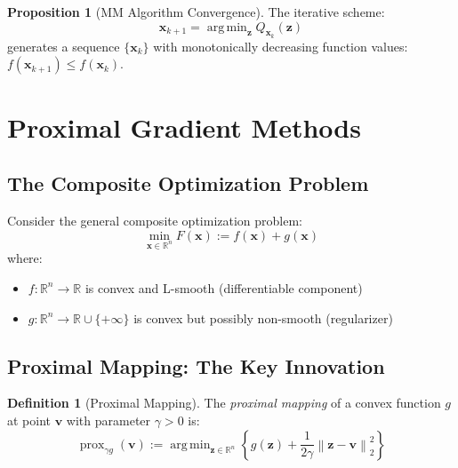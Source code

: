 \documentclass[12pt]{article}
\renewcommand{\vec}[1]{\mathbf{#1}}
\DeclareMathOperator{\prox}{prox}
\DeclareMathOperator{\argmin}{arg\,min}
\newcommand{\norm}[1]{\left\lVert#1\right\rVert}
\newcommand{\R}{\mathbb{R}}
\theoremstyle{definition}
\newtheorem{definition}{Definition}[section]
\newtheorem{proposition}[theorem]{Proposition}
\begin{document}
\begin{proposition}[MM Algorithm Convergence]
    The iterative scheme:
    \begin{equation}
        \vec{x}_{k+1} = \argmin_{\vec{z}} Q_{\vec{x}_k}(\vec{z})
    \end{equation}
    generates a sequence $\{\vec{x}_k\}$ with monotonically decreasing function values: $f(\vec{x}_{k+1}) \leq f(\vec{x}_k)$.
\end{proposition}


\newpage
\section{Proximal Gradient Methods}

\subsection{The Composite Optimization Problem}

Consider the general composite optimization problem:
\begin{equation}
    \min_{\vec{x} \in \R^n} F(\vec{x}) := f(\vec{x}) + g(\vec{x})
    \label{eq:composite}
\end{equation}
where:
\begin{itemize}
    \item $f: \R^n \to \R$ is convex and L-smooth (differentiable component)
    \item $g: \R^n \to \R \cup \{+\infty\}$ is convex but possibly non-smooth (regularizer)
\end{itemize}

\subsection{Proximal Mapping: The Key Innovation}

\begin{definition}[Proximal Mapping]\label{def:prox}
    The \textit{proximal mapping} of a convex function $g$ at point $\vec{v}$ with parameter $\gamma > 0$ is:
    \begin{equation}
        \prox_{\gamma g}(\vec{v}) := \argmin_{\vec{z} \in \R^n} \left\{g(\vec{z}) + \frac{1}{2\gamma}\norm{\vec{z} - \vec{v}}_2^2\right\}
        \label{eq:prox_def}
    \end{equation}
\end{definition}
\end{document}

